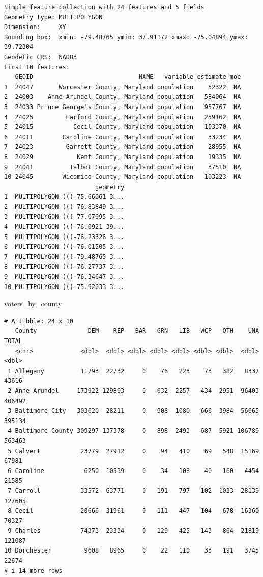 \documentclass[
  letterpaper,
  DIV=11,
  numbers=noendperiod]{scrreprt}
\newenvironment{Shaded}{\begin{snugshade}}{\end{snugshade}}
\newcommand{\NormalTok}[1]{\textcolor[rgb]{0.00,0.23,0.31}{#1}}
\begin{document}
\begin{verbatim}
Simple feature collection with 24 features and 5 fields
Geometry type: MULTIPOLYGON
Dimension:     XY
Bounding box:  xmin: -79.48765 ymin: 37.91172 xmax: -75.04894 ymax: 39.72304
Geodetic CRS:  NAD83
First 10 features:
   GEOID                             NAME   variable estimate moe
1  24047       Worcester County, Maryland population    52322  NA
2  24003    Anne Arundel County, Maryland population   584064  NA
3  24033 Prince George's County, Maryland population   957767  NA
4  24025         Harford County, Maryland population   259162  NA
5  24015           Cecil County, Maryland population   103370  NA
6  24011        Caroline County, Maryland population    33234  NA
7  24023         Garrett County, Maryland population    28955  NA
8  24029            Kent County, Maryland population    19335  NA
9  24041          Talbot County, Maryland population    37510  NA
10 24045        Wicomico County, Maryland population   103223  NA
                         geometry
1  MULTIPOLYGON (((-75.66061 3...
2  MULTIPOLYGON (((-76.83849 3...
3  MULTIPOLYGON (((-77.07995 3...
4  MULTIPOLYGON (((-76.0921 39...
5  MULTIPOLYGON (((-76.23326 3...
6  MULTIPOLYGON (((-76.01505 3...
7  MULTIPOLYGON (((-79.48765 3...
8  MULTIPOLYGON (((-76.27737 3...
9  MULTIPOLYGON (((-76.34647 3...
10 MULTIPOLYGON (((-75.92033 3...
\end{verbatim}

\begin{Shaded}
\begin{Highlighting}[]
\NormalTok{voters\_by\_county}
\end{Highlighting}
\end{Shaded}

\begin{verbatim}
# A tibble: 24 x 10
   County              DEM    REP   BAR   GRN   LIB   WCP   OTH    UNA  TOTAL
   <chr>             <dbl>  <dbl> <dbl> <dbl> <dbl> <dbl> <dbl>  <dbl>  <dbl>
 1 Allegany          11793  22732     0    76   223    73   382   8337  43616
 2 Anne Arundel     173922 129893     0   632  2257   434  2951  96403 406492
 3 Baltimore City   303620  28211     0   908  1080   666  3984  56665 395134
 4 Baltimore County 309297 137378     0   898  2493   687  5921 106789 563463
 5 Calvert           23779  27912     0    94   410    69   548  15169  67981
 6 Caroline           6250  10539     0    34   108    40   160   4454  21585
 7 Carroll           33572  63771     0   191   797   102  1033  28139 127605
 8 Cecil             20666  31961     0   111   447   104   678  16360  70327
 9 Charles           74373  23334     0   129   425   143   864  21819 121087
10 Dorchester         9608   8965     0    22   110    33   191   3745  22674
# i 14 more rows
\end{verbatim}
\end{document}
